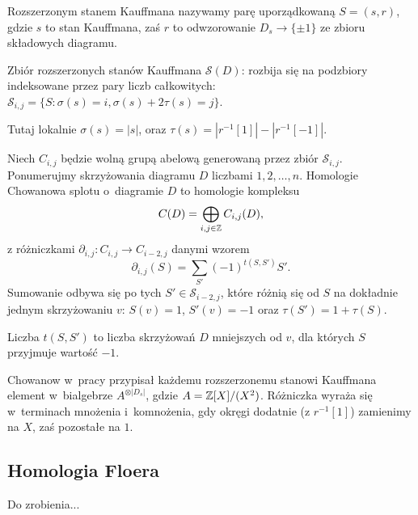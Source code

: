 \begin{definition}
    Rozszerzonym stanem Kauffmana nazywamy parę uporządkowaną $S = (s, r)$,
    gdzie $s$ to stan Kauffmana,
    zaś $r$ to odwzorowanie $D_s \to \{\pm 1\}$ ze zbioru składowych diagramu.
\end{definition}

\begin{definition}
    Zbiór rozszerzonych stanów Kauffmana $\mathcal S(D)$:
    rozbija się na podzbiory indeksowane przez pary liczb całkowitych:
    $\mathcal S_{i, j} = \{S : \sigma(s) = i, \sigma(s) + 2 \tau(s) = j\}$.
\end{definition}

Tutaj lokalnie $\sigma(s) = |s|$, oraz $\tau(s) = |r^{-1}[1]| - |r^{-1}[-1]|$.


\begin{definition}
    Niech $C_{i, j}$ będzie wolną grupą abelową generowaną przez zbiór $\mathcal S_{i, j}$.
    Ponumerujmy skrzyżowania diagramu $D$ liczbami $1, 2, \ldots, n$.
    Homologie Chowanowa splotu o~diagramie $D$ to homologie kompleksu
    \[
        C(D) = \bigoplus_{i, j \in \mathbb Z} C_{i, j}(D),
    \]
    z różniczkami $\partial_{i, j} \colon C_{i,j} \to C_{i-2, j}$ danymi wzorem
    \[
        \partial_{i, j}(S) = \sum_{S'} (-1)^{t(S, S')}  S'.
    \]
    Sumowanie odbywa się po tych $S' \in \mathcal S_{i-2, j}$,
    które różnią się od $S$ na dokładnie jednym skrzyżowaniu $v$:
    $S(v) = 1$, $S'(v) = -1$ oraz $\tau(S') = 1 + \tau (S)$.

    Liczba $t(S, S')$ to liczba skrzyżowań $D$ mniejszych od $v$, dla których $S$ przyjmuje wartość $-1$.
\end{definition}

Chowanow w~pracy \cite{khovanov00} przypisał każdemu rozszerzonemu stanowi Kauffmana
element w~bialgebrze $A^{\otimes |D_s|}$, gdzie $A = \mathbb Z[X]/(X^2)$.
Różniczka wyraża się w~terminach mnożenia i~komnożenia,
gdy okręgi dodatnie (z $r^{-1}[1]$) zamienimy na $X$, zaś pozostałe na $1$.


\subsection{Homologia Floera}
Do zrobienia...


